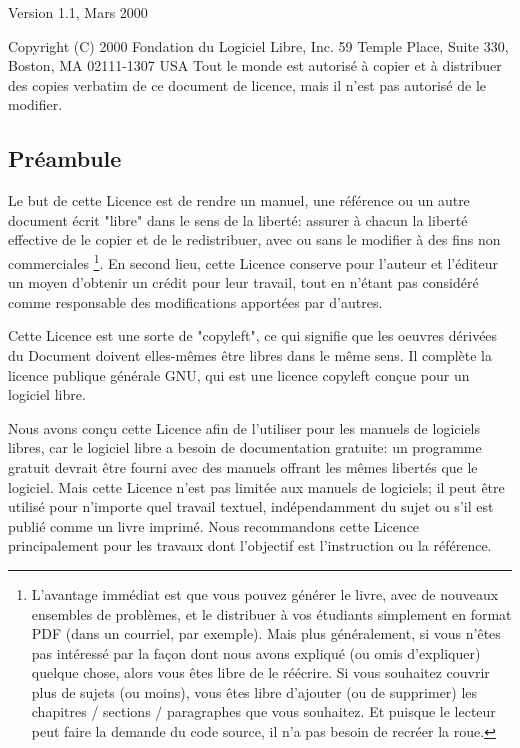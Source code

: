 	\begin{center}
	Version 1.1, Mars 2000
		
	Copyright (C) 2000 Fondation du Logiciel Libre, Inc. 59 Temple Place, Suite 330, Boston, MA 02111-1307 USA Tout le monde est autoris\'e à copier et à distribuer des copies verbatim de ce document de licence, mais il n'est pas autoris\'e de le modifier. 
	\end{center}

	\subsection{Pr\'eambule} 
	Le but de cette Licence est de rendre un manuel, une r\'ef\'erence ou un autre document \'ecrit "libre" dans le sens de la libert\'e: assurer à chacun la libert\'e effective de le copier et de le redistribuer, avec ou sans le modifier à des fins non commerciales \footnote{L'avantage imm\'ediat est que vous pouvez g\'en\'erer le livre, avec de nouveaux ensembles de problèmes, et le distribuer à vos \'etudiants simplement en format PDF (dans un courriel, par exemple). Mais plus g\'en\'eralement, si vous n'êtes pas int\'eress\'e par la façon dont nous avons expliqu\'e (ou omis d'expliquer) quelque chose, alors vous êtes libre de le r\'e\'ecrire. Si vous souhaitez couvrir plus de sujets (ou moins), vous êtes libre d'ajouter (ou de supprimer) les chapitres / sections / paragraphes que vous souhaitez. Et puisque le lecteur peut faire la demande du code source, il n'a pas besoin de recr\'eer la roue.}. En second lieu, cette Licence conserve pour l'auteur et l'\'editeur un moyen d'obtenir un cr\'edit pour leur travail, tout en n'\'etant pas consid\'er\'e comme responsable des modifications apport\'ees par d'autres.

	Cette Licence est une sorte de "copyleft", ce qui signifie que les oeuvres d\'eriv\'ees du Document doivent elles-mêmes être libres dans le même sens. Il complète la licence publique g\'en\'erale GNU, qui est une licence copyleft conçue pour un logiciel libre.

	Nous avons conçu cette Licence afin de l'utiliser pour les manuels de logiciels libres, car le logiciel libre a besoin de documentation gratuite: un programme gratuit devrait être fourni avec des manuels offrant les mêmes libert\'es que le logiciel. Mais cette Licence n'est pas limit\'ee aux manuels de logiciels; il peut être utilis\'e pour n'importe quel travail textuel, ind\'ependamment du sujet ou s'il est publi\'e comme un livre imprim\'e. Nous recommandons cette Licence principalement pour les travaux dont l'objectif est l'instruction ou la r\'ef\'erence.

